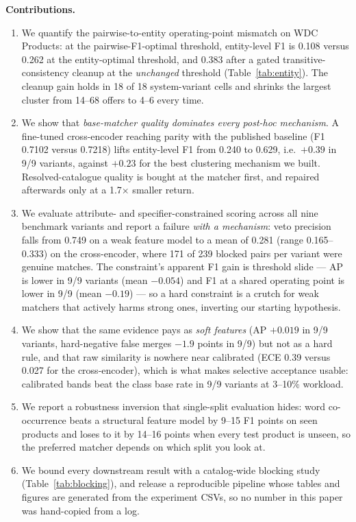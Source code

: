 \documentclass[conference]{IEEEtran}
\begin{document}
\textbf{Contributions.}
\begin{enumerate}
\item We quantify the pairwise-to-entity operating-point mismatch on WDC Products: at the
  pairwise-F1-optimal threshold, entity-level F1 is 0.108 versus 0.262 at the entity-optimal threshold, and
  0.383 after a gated transitive-consistency cleanup at the \emph{unchanged} threshold (Table~\ref{tab:entity}).
  The cleanup gain holds in 18 of 18 system-variant cells and shrinks the largest cluster from 14--68 offers
  to 4--6 every time.
\item We show that \emph{base-matcher quality dominates every post-hoc mechanism}. A fine-tuned
  cross-encoder reaching parity with the published baseline (F1 0.7102 versus 0.7218) lifts entity-level
  F1 from 0.240 to 0.629, i.e.\ $+0.39$ in 9/9 variants, against $+0.23$ for the best clustering mechanism
  we built. Resolved-catalogue quality is bought at the matcher first, and repaired afterwards only at a
  1.7$\times$ smaller return.
\item We evaluate attribute- and specifier-constrained scoring across all nine benchmark variants and
  report a failure \emph{with a mechanism}: veto precision falls from 0.749 on a weak feature model to a
  mean of 0.281 (range 0.165--0.333) on the cross-encoder, where 171 of 239 blocked pairs per variant were
  genuine matches. The constraint's apparent F1 gain is threshold slide --- AP is lower in 9/9 variants
  (mean $-0.054$) and F1 at a shared operating point is lower in 9/9 (mean $-0.19$) --- so a hard
  constraint is a crutch for weak matchers that actively harms strong ones, inverting our starting
  hypothesis.
\item We show that the same evidence pays as \emph{soft features} (AP $+0.019$ in 9/9 variants,
  hard-negative false merges $-1.9$ points in 9/9) but not as a hard rule, and that raw similarity is
  nowhere near calibrated (ECE 0.39 versus 0.027 for the cross-encoder), which is what makes selective
  acceptance usable: calibrated bands beat the class base rate in 9/9 variants at 3--10\% workload.
\item We report a robustness inversion that single-split evaluation hides: word co-occurrence beats a
  structural feature model by 9--15 F1 points on seen products and loses to it by 14--16 points when every
  test product is unseen, so the preferred matcher depends on which split you look at.
\item We bound every downstream result with a catalog-wide blocking study (Table~\ref{tab:blocking}), and
  release a reproducible pipeline whose tables and figures are generated from the experiment CSVs, so no
  number in this paper was hand-copied from a log.
\end{enumerate}
\end{document}
